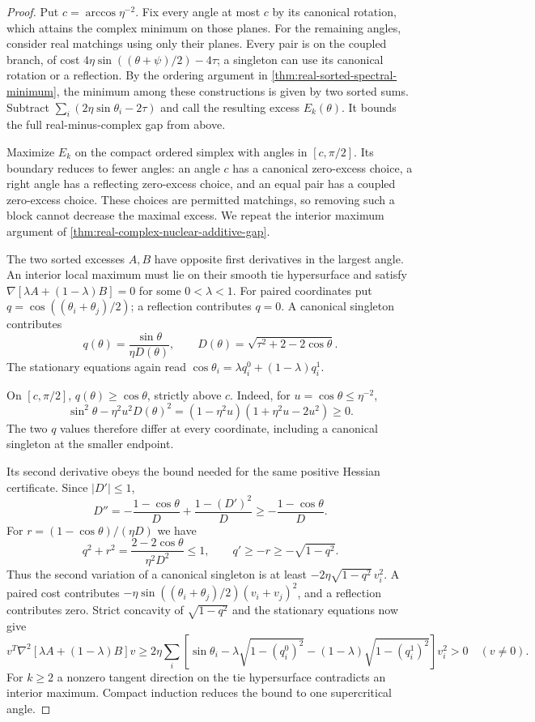 \begin{proof}
Put $c=\arccos\eta^{-2}$. Fix every angle at most $c$ by its canonical
rotation, which attains the complex minimum on those planes. For the
remaining angles, consider real matchings using only their planes.
Every pair is on the coupled branch, of cost
$4\eta\sin((\theta+\psi)/2)-4\tau$; a singleton can use its
canonical rotation or a reflection. By the ordering argument in
\cref{thm:real-sorted-spectral-minimum}, the minimum among these
constructions is given by two sorted sums.
Subtract $\sum_i(2\eta\sin\theta_i-2\tau)$ and call the resulting
excess $E_k(\theta)$. It bounds the full real-minus-complex gap from
above.

Maximize $E_k$ on the compact ordered simplex with angles in
$[c,\pi/2]$. Its boundary reduces to fewer angles: an angle $c$ has
a canonical zero-excess choice, a right angle has a reflecting
zero-excess choice, and an equal pair has a coupled zero-excess choice.
These choices are permitted matchings, so removing such a block cannot
decrease the maximal excess. We repeat the interior maximum argument of
\cref{thm:real-complex-nuclear-additive-gap}.

The two sorted excesses $A,B$ have opposite first derivatives in the
largest angle. An interior local maximum must lie on their smooth tie
hypersurface and satisfy
$\nabla[\lambda A+(1-\lambda)B]=0$ for some $0<\lambda<1$.
For paired coordinates put $q=\cos((\theta_i+\theta_j)/2)$; a
reflection contributes $q=0$. A canonical singleton contributes
\[
 q(\theta)=\frac{\sin\theta}{\eta D(\theta)},\qquad
 D(\theta)=\sqrt{\tau^2+2-2\cos\theta}.
\]
The stationary equations again read
$\cos\theta_i=\lambda q_i^0+(1-\lambda)q_i^1$.

On $[c,\pi/2]$, $q(\theta)\geq\cos\theta$, strictly above $c$.
Indeed, for $u=\cos\theta\leq\eta^{-2}$,
\[
 \sin^2\theta-\eta^2u^2D(\theta)^2
    =(1-\eta^2u)(1+\eta^2u-2u^2)\geq0.
\]
The two $q$ values therefore differ at every coordinate, including a
canonical singleton at the smaller endpoint.

Its second derivative obeys the bound needed for the same positive
Hessian certificate. Since $|D'|\leq1$,
\[
 D''=-\frac{1-\cos\theta}{D}
              +\frac{1-(D')^2}{D}
       \geq-\frac{1-\cos\theta}{D}.
\]
For $r=(1-\cos\theta)/(\eta D)$ we have
\[
 q^2+r^2=\frac{2-2\cos\theta}{\eta^2D^2}\leq1,
 \qquad q'\geq-r\geq-\sqrt{1-q^2}.
\]
Thus the second variation of a canonical singleton is at least
$-2\eta\sqrt{1-q^2}\,v_i^2$. A paired cost contributes
$-\eta\sin((\theta_i+\theta_j)/2)(v_i+v_j)^2$, and a reflection
contributes zero. Strict concavity of $\sqrt{1-q^2}$ and the stationary
equations now give
\[
 v^T\nabla^2[\lambda A+(1-\lambda)B]v
 \geq2\eta\sum_i\left[\sin\theta_i
    -\lambda\sqrt{1-(q_i^0)^2}
    -(1-\lambda)\sqrt{1-(q_i^1)^2}\right]v_i^2>0
 \quad(v\ne0).
\]
For $k\geq2$ a nonzero tangent direction on the tie hypersurface
contradicts an interior maximum. Compact induction reduces the bound to
one supercritical angle.


\end{proof}
